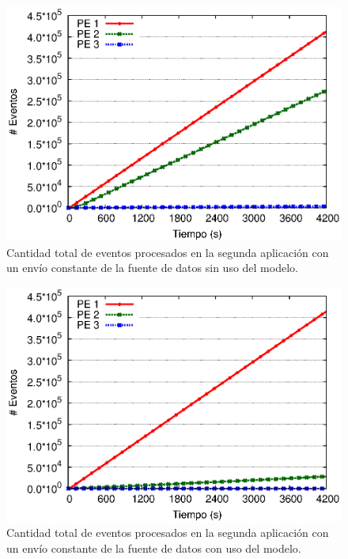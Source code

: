 \begin{figure}[!ht]
\centering
    \includegraphics[scale=0.7]{images/exp/app2/uniform/cm/eventCount.eps}
    \caption{Cantidad total de eventos procesados en la segunda aplicación con un envío constante de la fuente de datos sin uso del modelo.}
    \label{fig:app2-uniform-eventCount-cm}
\end{figure}

\begin{figure}[!ht]
\centering
    \includegraphics[scale=0.7]{images/exp/app2/uniform/sm/eventCount.eps}
    \caption{Cantidad total de eventos procesados en la segunda aplicación con un envío constante de la fuente de datos con uso del modelo.}
    \label{fig:app2-uniform-eventCount-sm}
\end{figure}

